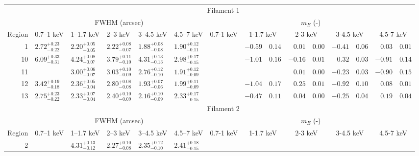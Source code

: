 \begin{tabular}{@{}rlllllr@{ $\pm$ }lr@{ $\pm$ }lr@{ $\pm$ }lr@{ $\pm$ }lr@{ $\pm$ }l@{}}
\toprule
{} & \multicolumn{15}{c}{Filament 1} \\
\cmidrule(l){2-16}
{} & \multicolumn{5}{c}{FWHM (arcsec)} & \multicolumn{10}{c}{$m_E$ (-)} \\
\cmidrule(l){2-6} \cmidrule(l){7-16}
Region & 0.7--1 keV & 1--1.7 keV & 2--3 keV & 3--4.5 keV & 4.5--7 keV
& \multicolumn{2}{c}{0.7-1 keV} & \multicolumn{2}{c}{1-1.7 keV}
& \multicolumn{2}{c}{2-3 keV} & \multicolumn{2}{c}{3-4.5 keV}
& \multicolumn{2}{c}{4.5-7 keV}\\
\midrule
1 & ${2.72}^{+0.23}_{-0.22}$ & ${2.20}^{+0.05}_{-0.05}$ & ${2.22}^{+0.08}_{-0.07}$ & ${1.88}^{+0.08}_{-0.08}$ & ${1.90}^{+0.12}_{-0.11}$
  & \multicolumn{2}{c}{} & $-0.59$ & $0.14$ & $0.01$ & $0.00$ & $-0.41$ & $0.06$ & $0.03$ & $0.01$\\
10 & ${6.09}^{+0.33}_{-0.31}$ & ${4.24}^{+0.08}_{-0.07}$ & ${3.79}^{+0.11}_{-0.10}$ & ${4.31}^{+0.13}_{-0.13}$ & ${2.98}^{+0.17}_{-0.15}$
   & \multicolumn{2}{c}{} & $-1.01$ & $0.16$ & $-0.16$ & $0.01$ & $0.32$ & $0.03$ & $-0.91$ & $0.14$\\
11 & {} & ${3.00}^{+0.06}_{-0.07}$ & ${3.03}^{+0.10}_{-0.09}$ & ${2.76}^{+0.12}_{-0.10}$ & ${1.91}^{+0.12}_{-0.09}$
   & \multicolumn{4}{c}{} & $0.01$ & $0.00$ & $-0.23$ & $0.03$ & $-0.90$ & $0.15$\\
12 & ${3.42}^{+0.19}_{-0.18}$ & ${2.36}^{+0.05}_{-0.04}$ & ${2.80}^{+0.08}_{-0.08}$ & ${1.93}^{+0.07}_{-0.06}$ & ${1.99}^{+0.11}_{-0.09}$
   & \multicolumn{2}{c}{} & $-1.04$ & $0.17$ & $0.25$ & $0.01$ & $-0.92$ & $0.10$ & $0.08$ & $0.01$\\
13 & ${2.75}^{+0.23}_{-0.22}$ & ${2.33}^{+0.07}_{-0.04}$ & ${2.40}^{+0.10}_{-0.09}$ & ${2.16}^{+0.10}_{-0.09}$ & ${2.33}^{+0.17}_{-0.15}$
   & \multicolumn{2}{c}{} & $-0.47$ & $0.11$ & $0.04$ & $0.00$ & $-0.25$ & $0.04$ & $0.19$ & $0.04$\\
\midrule
{} & \multicolumn{15}{c}{Filament 2} \\
\cmidrule(l){2-16}
{} & \multicolumn{5}{c}{FWHM (arcsec)} & \multicolumn{10}{c}{$m_E$ (-)} \\
\cmidrule(l){2-6} \cmidrule(l){7-16}
Region & 0.7--1 keV & 1--1.7 keV & 2--3 keV & 3--4.5 keV & 4.5--7 keV
& \multicolumn{2}{c}{0.7-1 keV} & \multicolumn{2}{c}{1-1.7 keV}
& \multicolumn{2}{c}{2-3 keV} & \multicolumn{2}{c}{3-4.5 keV}
& \multicolumn{2}{c}{4.5-7 keV}\\
\midrule
2 & {} & ${4.31}^{+0.13}_{-0.12}$ & ${2.27}^{+0.10}_{-0.08}$ & ${2.35}^{+0.12}_{-0.10}$ & ${2.41}^{+0.18}_{-0.15}$

\end{tabular}
